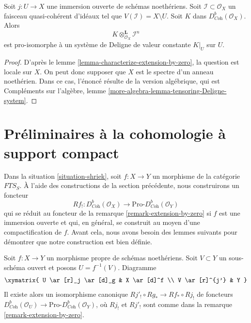 \begin{lemma}
\label{lemma-tensoring-Deligne-system}
Soit $j : U \to X$ une immersion ouverte de schémas noethériens. Soit $\mathcal{I} \subset \mathcal{O}_X$ un faisceau quasi-cohérent d'idéaux tel que $V(\mathcal{I}) = X \setminus U$. Soit $K$ dans $D^b_{\textit{Coh}}(\mathcal{O}_X)$. Alors
$$
K \otimes_{\mathcal{O}_X}^\mathbf{L} \mathcal{I}^n
$$
est pro-isomorphe à un système de Deligne de valeur constante $K|_U$ sur $U$.
\end{lemma}

\begin{proof}
D'après le lemme \ref{lemma-characterize-extension-by-zero}, la question est locale sur $X$. On peut donc supposer que $X$ est le spectre d'un anneau noethérien. Dans ce cas, l'énoncé résulte de la version algébrique, qui est Compléments sur l'algèbre, lemme \ref{more-algebra-lemma-tensoring-Deligne-system}.
\end{proof}







\section{Préliminaires à la cohomologie à support compact}
\label{section-preliminaries-compactly-supported}

\noindent
Dans la situation \ref{situation-shriek}, soit $f : X \to Y$ un morphisme de la catégorie $\textit{FTS}_S$. À l'aide des constructions de la section précédente, nous construirons un foncteur
$$
Rf_! :
D^b_{\textit{Coh}}(\mathcal{O}_X)
\longrightarrow
\text{Pro-}D^b_{\textit{Coh}}(\mathcal{O}_Y)
$$
qui se réduit au foncteur de la remarque \ref{remark-extension-by-zero} si $f$ est une immersion ouverte et qui, en général, se construit au moyen d'une compactification de $f$. Avant cela, nous avons besoin des lemmes suivants pour démontrer que notre construction est bien définie.

\begin{lemma}
\label{lemma-well-defined-pre}
Soit $f : X \to Y$ un morphisme propre de schémas noethériens. Soit $V \subset Y$ un sous-schéma ouvert et posons $U = f^{-1}(V)$. Diagramme
$$
\xymatrix{
U \ar[r]_j \ar[d]_g & X \ar[d]^f \\
V \ar[r]^{j'} & Y
}
$$
Il existe alors un isomorphisme canonique $Rj'_! \circ Rg_* \to Rf_* \circ Rj_!$ de foncteurs $D^b_{\textit{Coh}}(\mathcal{O}_U) \to
\text{Pro-}D^b_{\textit{Coh}}(\mathcal{O}_Y)$, où $Rj_!$ et $Rj'_!$ sont comme dans la remarque \ref{remark-extension-by-zero}.
\end{lemma}

